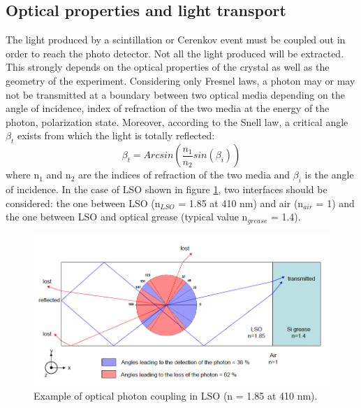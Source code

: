 \subsection{Optical properties and light transport}
The light produced by a scintillation or Cerenkov event must be coupled out in order to reach the photo detector. Not all the light produced will be extracted. This strongly depends on the optical properties of the crystal as well as the geometry of the experiment. 
Considering only Fresnel laws, a photon may or may not be transmitted at a boundary between two optical media depending on the angle of incidence, index of refraction of the two media at the energy of the photon, polarization state. 
Moreover, according to the Snell law, a critical angle $\beta _{t}$ exists from which the light is totally reflected:
\begin{equation}
\beta _{t} = Arcsin(\frac{n_{1}}{n_{2}}sin(\beta _{i}))
\end{equation}
where n$_{1}$ and n$_{2}$ are the indices of refraction of the two media and $\beta _{i}$ is the angle of incidence.
In the case of LSO shown in figure \ref{fig:detector}, two interfaces should be considered: the one between LSO (n$_{LSO}$ = 1.85 at 410 nm) and air (n$_{air}$ = 1) and the one between LSO and optical grease (typical value n$_{grease}$ = 1.4).
\begin{figure}[htbp]
\centering
\includegraphics[width=12cm]{../Pictures/Chapter_2/optical_transport.png}
\caption[Transport of optical photons]{Example of optical photon coupling in LSO (n = 1.85 at 410 nm).}
\label{fig:detector}
\end{figure}

